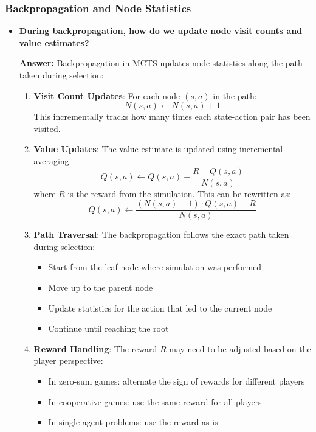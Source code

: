 \subsubsection{Backpropagation and Node Statistics}
\begin{itemize}
    \item \textbf{During backpropagation, how do we update node visit counts and value estimates?}
    
    \textbf{Answer:} Backpropagation in MCTS updates node statistics along the path taken during selection:
    
    \begin{enumerate}
        \item \textbf{Visit Count Updates}: For each node $(s,a)$ in the path:
        \[N(s,a) \leftarrow N(s,a) + 1\]
        This incrementally tracks how many times each state-action pair has been visited.
        
        \item \textbf{Value Updates}: The value estimate is updated using incremental averaging:
        \[Q(s,a) \leftarrow Q(s,a) + \frac{R - Q(s,a)}{N(s,a)}\]
        where $R$ is the reward from the simulation. This can be rewritten as:
        \[Q(s,a) \leftarrow \frac{(N(s,a) - 1) \cdot Q(s,a) + R}{N(s,a)}\]
        
        \item \textbf{Path Traversal}: The backpropagation follows the exact path taken during selection:
        \begin{itemize}
            \item Start from the leaf node where simulation was performed
            \item Move up to the parent node
            \item Update statistics for the action that led to the current node
            \item Continue until reaching the root
        \end{itemize}
        
        \item \textbf{Reward Handling}: The reward $R$ may need to be adjusted based on the player perspective:
        \begin{itemize}
            \item In zero-sum games: alternate the sign of rewards for different players
            \item In cooperative games: use the same reward for all players
            \item In single-agent problems: use the reward as-is
        \end{itemize}
        

\end{enumerate}
\end{itemize}
